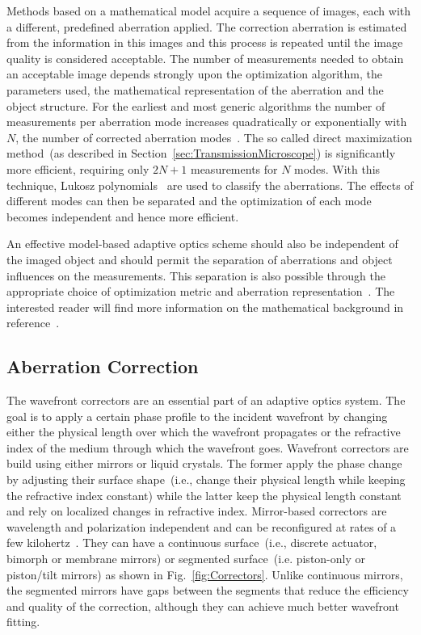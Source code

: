 Methods based on a mathematical model acquire a sequence of images, each with a different, predefined aberration applied. The correction aberration is estimated from the information in this images and this process is repeated until the image quality is considered acceptable. The number of measurements needed to obtain an acceptable image depends strongly upon the optimization algorithm, the parameters used, the mathematical representation of the aberration and the object structure. For the earliest and most generic algorithms the number of measurements per aberration mode increases quadratically or exponentially with $N$, the number of corrected aberration modes~\cite{wide_sphere_packing}. The so called direct maximization method~(as described in Section~\ref{sec:TransmissionMicroscope}) is significantly more efficient, requiring only $2N+1$ measurements for $N$ modes. With this technique, Lukosz polynomials~\cite{wide_Lukosz_Modes} are used to classify the aberrations. The effects of different modes can then be separated and the optimization of each mode becomes independent and hence more efficient.

An effective model-based adaptive optics scheme should also be independent of the imaged object and should permit the separation of aberrations and object influences on the measurements. This separation is also possible through the appropriate choice of optimization metric and aberration representation~\cite{wide_AOM_loew_freq}. The interested reader will find more information on the mathematical background in reference~\cite{wide_AOM_loew_freq, wide_sphere_packing, wide_Lukosz_Modes,wide_parabolic_optimization}. 


\subsection{Aberration Correction}
\label{sec:AberrationCorrection}

The wavefront correctors are an essential part of an adaptive optics system. The goal is to apply a certain phase profile to the incident wavefront by changing either the physical length over which the wavefront propagates or the refractive index of the medium through which the wavefront goes. Wavefront correctors are build using either mirrors or liquid crystals. The former apply the phase change by adjusting their surface shape~(i.e., change their physical length while keeping the refractive index constant) while the latter keep the physical length constant and rely on localized changes in refractive index.  Mirror-based correctors are wavelength and polarization independent and can be reconfigured at rates of a few kilohertz~\cite{AOM_basic_ref}. They can have a continuous surface~(i.e., discrete actuator, bimorph or membrane mirrors) or segmented surface~(i.e. piston-only or piston/tilt mirrors) as shown in Fig.~\ref{fig:Correctors}. Unlike continuous mirrors, the segmented mirrors have gaps between the segments that reduce the efficiency and quality of the correction, although they can achieve much better wavefront fitting. 

